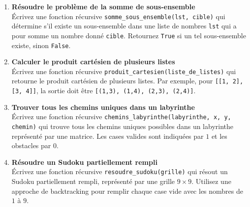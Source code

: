 \begin{enumerate}
    \item \textbf{Résoudre le problème de la somme de sous-ensemble} \\
    Écrivez une fonction récursive \texttt{somme\_sous\_ensemble(lst, cible)} qui détermine s'il existe un sous-ensemble dans une liste de nombres \texttt{lst} qui a pour somme un nombre donné \texttt{cible}. Retournez \texttt{True} si un tel sous-ensemble existe, sinon \texttt{False}.

    \item \textbf{Calculer le produit cartésien de plusieurs listes} \\
    Écrivez une fonction récursive \texttt{produit\_cartesien(liste\_de\_listes)} qui retourne le produit cartésien de plusieurs listes. Par exemple, pour \texttt{[[1, 2], [3, 4]]}, la sortie doit être \texttt{[(1,3), (1,4), (2,3), (2,4)]}.

    \item \textbf{Trouver tous les chemins uniques dans un labyrinthe} \\
    Écrivez une fonction récursive \texttt{chemins\_labyrinthe(labyrinthe, x, y, chemin)} qui trouve tous les chemins uniques possibles dans un labyrinthe représenté par une matrice. Les cases valides sont indiquées par $1$ et les obstacles par $0$.

    \item \textbf{Résoudre un Sudoku partiellement rempli} \\
    Écrivez une fonction récursive \texttt{resoudre\_sudoku(grille)} qui résout un Sudoku partiellement rempli, représenté par une grille $9 \times 9$. Utilisez une approche de backtracking pour remplir chaque case vide avec les nombres de $1$ à $9$.

\end{enumerate}

